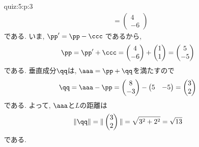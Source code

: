 \begin{answerof}{quiz:5:p:3}
\begin{align*}
  &=\begin{pmatrix}4\\-6\end{pmatrix}
  \end{align*}
  である.
  いま, $\pp'=\pp-\ccc$
  であるから,
  \begin{align*}
    \pp=\pp'+\ccc=\begin{pmatrix}4\\-6\end{pmatrix}+\begin{pmatrix}1\\1\end{pmatrix}=\begin{pmatrix}5\\-5\end{pmatrix}
  \end{align*}
  である.  
  垂直成分$\qq$は,
  $\aaa=\pp+\qq$を満たすので
  \begin{align*}
    \qq=\aaa-\pp
    =\begin{pmatrix}8\\-3\end{pmatrix}-\begin{pmatrix}5&-5\end{pmatrix}
    =\begin{pmatrix}3\\2\end{pmatrix}
  \end{align*}
  である.
  よって, $\aaa$と$L$の距離は
  \begin{align*}
    \|\qq\|= \|\begin{pmatrix}3\\2\end{pmatrix}\|=\sqrt{3^2+2^2}=\sqrt{13}
  \end{align*}
  である.


\end{answerof}
